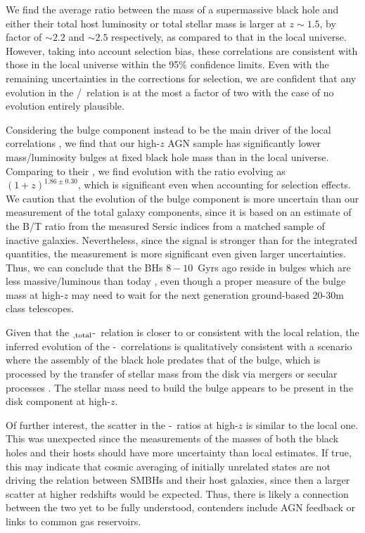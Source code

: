 \documentclass[apj]{emulateapj}
\begin{document}
We find the average ratio between the mass of a supermassive black hole and either their total host luminosity or total stellar mass is larger at $z\sim1.5$, by factor of $\sim2.2$ and $\sim2.5$ respectively, as compared to that in the local universe. However, taking into account selection bias, these correlations are
consistent with those in the local universe within the 95\% confidence limits. 
Even with the remaining uncertainties in the corrections for selection, we are confident that any evolution in the \mbh/\smass\ relation is at the most a factor of two with the case of no evolution entirely plausible.

Considering the bulge component instead to be the main driver of the local correlations \citep{Bennert11, Woo++08}, we find that our high-$z$ AGN sample has significantly lower mass/luminosity bulges at fixed black hole mass than in the local universe. Comparing to their \mbh, we find evolution with the ratio evolving as $(1+z)^{1.86\pm0.30}$, which is significant even when accounting for selection effects. We caution that the evolution of the bulge component is more uncertain than our measurement of the total galaxy components, since it is based on an estimate of the B/T ratio from the measured Sersic indices from a matched sample of inactive galaxies. Nevertheless, since the signal is stronger than for the integrated quantities, the measurement is more significant even given larger uncertainties.
Thus, we can conclude that the BHs $8-10$~Gyrs ago reside in bulges which are less massive/luminous than today \citep[see also][]{Bennert11,Park15}, even though a proper measure of the bulge mass at high-$z$ may need to wait for the next generation ground-based 20-30m class telescopes. 

Given that the \smass$_{\rm ,total}$-\mbh\ relation is closer to or consistent with the local relation, the inferred evolution of the \bmass-\mbh\ correlations is qualitatively consistent with a scenario where the assembly of the black hole predates that of the bulge, which is processed by the transfer of stellar mass from the disk via mergers or secular processes \citep{Croton2006}. The stellar mass need to build the bulge appears to be present in the disk component at high-$z$.

Of further interest, the scatter in the \mbh-\smass\ ratios at high-$z$ is similar to the local one. This was unexpected since the measurements of the masses of both the black holes and their hosts should have more uncertainty than local estimates. If true, this may indicate that cosmic averaging of initially unrelated states \citep{Peng2007} are not driving the relation between SMBHs and their host galaxies, since then a larger scatter at higher redshifts would be expected. Thus, there is likely a connection between the two yet to be fully understood, contenders include AGN feedback or links to common gas reservoirs.
\end{document}
